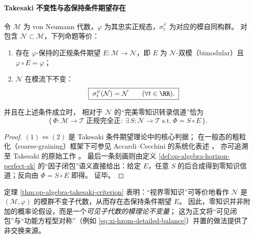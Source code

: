 \paragraph{Takesaki 不变性与态保持条件期望存在}
\begin{theorem}\label{thm:op-algebra-takesaki-criterion}
令 \(\mathcal{M}\) 为 von Neumann 代数，\(\varphi\) 为其忠实正规态，\(\sigma_t^\varphi\) 为对应的模自同构群。
对包含 \(\mathcal{N}\subset\mathcal{M}\)，下列命题等价：
\begin{enumerate}
  \item 存在 \(\varphi\)-保持的正规条件期望 \(E:\mathcal{M}\to\mathcal{N}\)，即 \(E\) 为 \(\mathcal{N}\)-双模（bimodular）且 \(\varphi\circ E=\varphi\)；
  \item \(\mathcal{N}\) 在模流下不变：
  \begin{equation}\label{eq:op-algebra-modular-invariance}
  \boxed{\;\sigma_t^\varphi(\mathcal{N})=\mathcal{N}\qquad(\forall t\in\RR).\;}
  \end{equation}
\end{enumerate}
并且在上述条件成立时，
相对于 \(\mathcal{N}\) 的“完美零知识转录信道”恰为
\[
\bigl\{\,\Phi:\mathcal{M}\to\mathcal{T}\ \text{正规完全正}:\ \exists\,S:\mathcal{N}\to\mathcal{T}\ \text{s.t.}\ \Phi=S\circ E\,\bigr\}.
\]
\end{theorem}

\begin{proof}
\((1)\Leftrightarrow(2)\) 是 Takesaki 条件期望理论中的核心判据；
在一般态的粗粒化（coarse-graining）框架下可参见 Accardi--Cecchini 的系统化表述 \cite{AccardiCecchini1982ConditionalExpectationsTakesaki}，
亦可追溯至 Takesaki 的原始工作 \cite{Takesaki1972ConditionalExpectationsVNA}。
最后一条刻画则由定义 \ref{def:op-algebra-horizon-perfect-zk} 的“因子闭包”语义直接给出：给定 \(E\)，任意 \(S\) 的后合成得到零知识信道；反向由 \(\Phi=S\circ E\) 即得。
证毕。
\end{proof}

\begin{remark}[零知识的算子代数等价表述]\label{rem:op-algebra-zk-as-fixed-subalgebra}
定理 \ref{thm:op-algebra-takesaki-criterion} 表明：“视界零知识”可等价地看作
\(\mathcal{N}\) 是 \((\mathcal{M},\varphi)\) 的模群不变子代数，从而存在态保持条件期望 \(E\)。
因此，零知识并非附加的概率论假设，而是一个\emph{可见子代数的模理论不变量}；
这为正文将“可见闭包”与“功能方程型对称”（例如 \eqref{eq:xi-hzom-detailed-balance}）并置的做法提供了非交换来源。
\end{remark}

